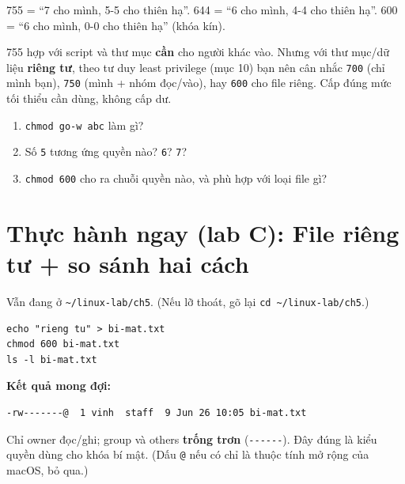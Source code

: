 \documentclass[12pt,a4paper]{article}
\newcommand{\cmd}[1]{\texttt{#1}}
\begin{document}
\begin{notebox}
755 = ``7 cho mình, 5-5 cho thiên hạ''. 644 = ``6 cho mình, 4-4 cho thiên hạ''.
600 = ``6 cho mình, 0-0 cho thiên hạ'' (khóa kín).
\end{notebox}

\begin{warnbox}
755 hợp với script và thư mục \textbf{cần} cho người khác vào. Nhưng với thư
mục/dữ liệu \textbf{riêng tư}, theo tư duy least privilege (mục 10) bạn nên cân nhắc
\cmd{700} (chỉ mình bạn), \cmd{750} (mình + nhóm đọc/vào), hay \cmd{600} cho file
riêng. Cấp đúng mức tối thiểu cần dùng, không cấp dư.
\end{warnbox}

\begin{checkbox}
\begin{enumerate}
\item \cmd{chmod go-w abc} làm gì?
\item Số \cmd{5} tương ứng quyền nào? \cmd{6}? \cmd{7}?
\item \cmd{chmod 600} cho ra chuỗi quyền nào, và phù hợp với loại file gì?
\end{enumerate}
\end{checkbox}

\section{Thực hành ngay (lab C): File riêng tư + so sánh hai cách}

Vẫn đang ở \cmd{\textasciitilde/linux-lab/ch5}. (Nếu lỡ thoát, gõ lại
\cmd{cd \textasciitilde/linux-lab/ch5}.)

\begin{labbox}
\begin{Verbatim}
echo "rieng tu" > bi-mat.txt
chmod 600 bi-mat.txt
ls -l bi-mat.txt
\end{Verbatim}
\textbf{Kết quả mong đợi:}
\begin{Verbatim}
-rw-------@  1 vinh  staff  9 Jun 26 10:05 bi-mat.txt
\end{Verbatim}
Chỉ owner đọc/ghi; group và others \textbf{trống trơn} (\cmd{-{}-{}-{}-{}-{}-}). Đây
đúng là kiểu quyền dùng cho khóa bí mật. (Dấu \cmd{@} nếu có chỉ là thuộc tính mở
rộng của macOS, bỏ qua.)
\end{labbox}
\end{document}
